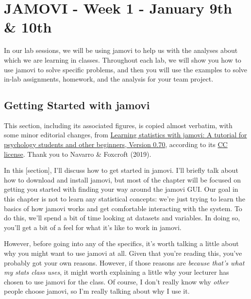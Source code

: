 \documentclass[
]{book}
\begin{document}
\hypertarget{jamovi---week-1---january-9th-10th}{%
\section{JAMOVI - Week 1 - January 9th \& 10th}\label{jamovi---week-1---january-9th-10th}}

In our lab sessions, we will be using jamovi to help us with the analyses about which we are learning in classes. Throughout each lab, we will show you how to use jamovi to solve specific problems, and then you will use the examples to solve in-lab assignments, homework, and the analysis for your team project.

\hypertarget{getting-started-with-jamovi}{%
\subsection{Getting Started with jamovi}\label{getting-started-with-jamovi}}

This section, including its associated figures, is copied almost verbatim, with some minor editorial changes, from \href{https://www.learnstatswithjamovi.com/}{Learning statistics with jamovi: A tutorial for psychology students and other beginners, Version 0.70}, according to its \href{https://creativecommons.org/licenses/by-sa/4.0/deed.ast}{CC license}. Thank you to Navarro \& Foxcroft (2019).

In this {[}section{]}, I'll discuss how to get started in jamovi. I'll briefly talk about how to download and install jamovi, but most of the chapter will be focused on getting you started with finding your way around the jamovi GUI. Our goal in this chapter is not to learn any statistical concepts: we're just trying to learn the basics of how jamovi works and get comfortable interacting with the system. To do this, we'll spend a bit of time looking at datasets and variables. In doing so, you'll get a bit of a feel for what it's like to work in jamovi.

However, before going into any of the specifics, it's worth talking a little about why you might want to use jamovi at all. Given that you're reading this, you've probably got your own reasons. However, if those reasons are \emph{because that's what my stats class uses}, it might worth explaining a little why your lecturer has chosen to use jamovi for the class. Of course, I don't really know why \emph{other} people choose jamovi, so I'm really talking about why I use it.
\end{document}
